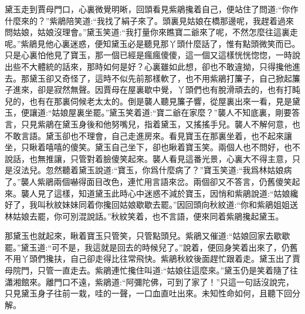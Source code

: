 \begin{parag}
    黛玉走到賈母門口，心裏微覺明晰，回頭看見紫鵑攙着自己，便站住了問道:“你作什麼來的？”紫鵑陪笑道:“我找了絹子來了。頭裏見姑娘在橋那邊呢，我趕着過來問姑娘，姑娘沒理會。”黛玉笑道:“我打量你來瞧寶二爺來了呢，不然怎麼往這裏走呢。”紫鵑見他心裏迷惑，便知黛玉必是聽見那丫頭什麼話了，惟有點頭微笑而已。只是心裏怕他見了寶玉，那一個已經是瘋瘋傻傻，這一個又這樣恍恍惚惚，一時說出些不大體統的話來，那時如何是好？心裏雖如此想，卻也不敢違拗，只得攙他進去。那黛玉卻又奇怪了，這時不似先前那樣軟了，也不用紫鵑打簾子，自己掀起簾子進來，卻是寂然無聲。因賈母在屋裏歇中覺，丫頭們也有脫滑頑去的，也有打盹兒的，也有在那裏伺候老太太的。倒是襲人聽見簾子響，從屋裏出來一看，見是黛玉，便讓道:“姑娘屋裏坐罷。”黛玉笑着道:“寶二爺在家麼？”襲人不知底裏，剛要答言，只見紫鵑在黛玉身後和他努嘴兒，指着黛玉，又搖搖手兒。襲人不解何意，也不敢言語。黛玉卻也不理會，自己走進房來。看見寶玉在那裏坐着，也不起來讓坐，只瞅着嘻嘻的傻笑。黛玉自己坐下，卻也瞅着寶玉笑。兩個人也不問好，也不說話，也無推讓，只管對着臉傻笑起來。襲人看見這番光景，心裏大不得主意，只是沒法兒。忽然聽着黛玉說道:“寶玉，你爲什麼病了？”寶玉笑道:“我爲林姑娘病了。”襲人紫鵑兩個嚇得面目改色，連忙用言語來岔。兩個卻又不答言，仍舊傻笑起來。襲人見了這樣，知道黛玉此時心中迷惑不減於寶玉，因悄和紫鵑說道:“姑娘纔好了，我叫秋紋妹妹同着你攙回姑娘歇歇去罷。”因回頭向秋紋道:“你和紫鵑姐姐送林姑娘去罷，你可別混說話。”秋紋笑着，也不言語，便來同着紫鵑攙起黛玉。
\end{parag}


\begin{parag}
    那黛玉也就起來，瞅着寶玉只管笑，只管點頭兒。紫鵑又催道:“姑娘回家去歇歇罷。”黛玉道:“可不是，我這就是回去的時候兒了。”說着，便回身笑着出來了，仍舊不用丫頭們攙扶，自己卻走得比往常飛快。紫鵑秋紋後面趕忙跟着走。黛玉出了賈母院門，只管一直走去。紫鵑連忙攙住叫道:“姑娘往這麼來。”黛玉仍是笑着隨了往瀟湘館來。離門口不遠，紫鵑道:“阿彌陀佛，可到了家了！”只這一句話沒說完，只見黛玉身子往前一栽，哇的一聲，一口血直吐出來。未知性命如何，且聽下回分解。
\end{parag}
